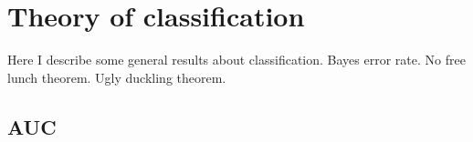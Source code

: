 \chapter{Theory of classification}
Here I describe some general results about classification. Bayes error rate. No free lunch theorem. Ugly duckling theorem.

\section{AUC}\label{sec:theory:auc}
